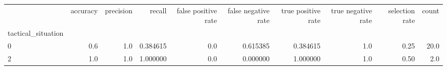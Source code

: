 \begin{tabular}{lrrrrrrrrr}
\toprule
{} &  accuracy &  precision &    recall &  false positive rate &  false negative rate &  true positive rate &  true negative rate &  selection rate &  count \\
tactical\_situation &           &            &           &                      &                      &                     &                     &                 &        \\
\midrule
0                  &       0.6 &        1.0 &  0.384615 &                  0.0 &             0.615385 &            0.384615 &                 1.0 &            0.25 &   20.0 \\
2                  &       1.0 &        1.0 &  1.000000 &                  0.0 &             0.000000 &            1.000000 &                 1.0 &            0.50 &    2.0 \\
\bottomrule
\end{tabular}
